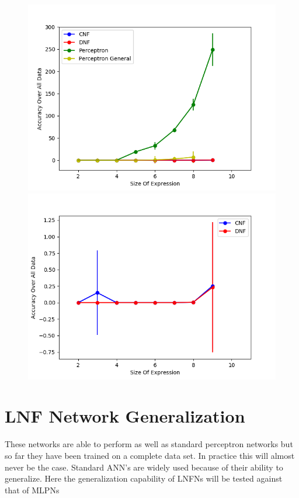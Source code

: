 \begin{figure}[H]
  \centering
  \begin{minipage}[b]{0.45\textwidth}
    \includegraphics[width=\textwidth]{All-Peformance-Comparason.png}
    \caption{}
    \label{fig:peformance-comparason-all}
  \end{minipage}
  \begin{minipage}[b]{0.45\textwidth}
    \includegraphics[width=\textwidth]{CNFvsDNF.png}
    \caption{}
    \label{fig:peformance-comparason-cnfdnf}
  \end{minipage}
  \hfill
\end{figure}

\section{LNF Network Generalization} \label{sec:lnfn-generalization}
These networks are able to perform as well as standard perceptron networks but so far they have been trained on a complete data set. In practice this will almost never be the case. Standard ANN's are widely used because of their ability to generalize. Here the generalization capability of LNFNs will be tested against that of MLPNs

